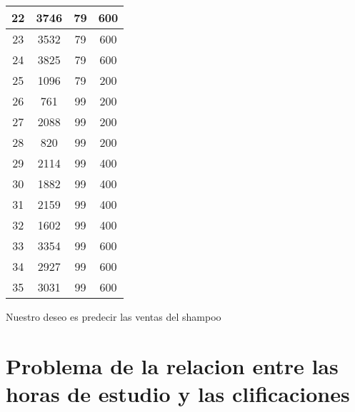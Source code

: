 \documentclass{article}
\begin{document}
\begin{table}
\begin{tabular}{|c|c|c|c|}
    22 & 3746 & 79 & 600 \\ \hline
    23 & 3532 & 79 & 600 \\ \hline
    24 & 3825 & 79 & 600 \\ \hline
    25 & 1096 & 79 & 200 \\ \hline
    26 & 761 & 99 & 200 \\ \hline
    27 & 2088 & 99 & 200 \\ \hline
    28 & 820 & 99 & 200 \\ \hline
    29 & 2114 & 99 & 400 \\ \hline
    30 & 1882 & 99 & 400 \\ \hline
    31 & 2159 & 99 & 400 \\ \hline
    32 & 1602 & 99 & 400 \\ \hline
    33 & 3354 & 99 & 600 \\ \hline
    34 & 2927 & 99 & 600 \\ \hline
    35 & 3031 & 99 & 600 \\ \hline
    \end{tabular}
\end{table}

Nuestro deseo es predecir las ventas del shampoo
\section{Problema de la relacion entre las horas de estudio y las clificaciones}
\end{document}
